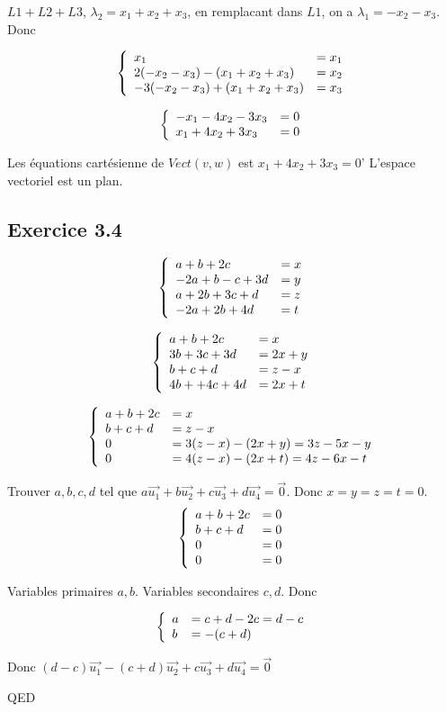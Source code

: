 \documentclass[]{book}
\theoremstyle{definition}
\begin{document}
$L1+L2+L3$, $\lambda_2 = x_1+x_2+x_3$, en remplacant dans $L1$, on a $\lambda_1 = -x_2 - x_3$. Donc

$$
\left\{ 
\begin{array}{l l}
x_1 & = x_1 \\
2(-x_2 - x_3) - (x_1 + x_2 + x_3) & = x_2 \\
-3(-x_2 - x_3) + (x_1 + x_2 + x_3) & = x_3 \\
\end{array}
\right. 
$$

$$
\left\{ 
\begin{array}{l l}
-x_1 - 4x_2 - 3x_3 & = 0 \\
x_1 + 4x_2 + 3x_3 & = 0 \\
\end{array}
\right. 
$$

Les \'equations cart\'esienne de $Vect(v,w)$ est $x_1 + 4x_2 + 3x_3 =0$' L'espace vectoriel est un plan.


\subsection*{Exercice 3.4}
$$
\left\{ 
\begin{array}{l l}
a + b + 2c & = x \\
-2a + b -c + 3d & = y \\
a + 2b + 3c + d & = z \\
-2a +2b + 4d & = t \\
\end{array}
\right. 
$$

$$
\left\{ 
\begin{array}{l l}
a + b + 2c & = x \\
 3b +3c + 3d & = 2x+y \\
 b + c + d & = z-x \\
4b + +4c + 4d & = 2x+t \\
\end{array}
\right. 
$$

$$
\left\{ 
\begin{array}{l l}
a + b + 2c & = x \\
 b + c + d & = z-x \\
 0 & = 3(z-x) - (2x+y) = 3z-5x-y \\
 0 & = 4(z-x) - (2x+t) = 4z -6x -t \\
\end{array}
\right. 
$$

Trouver $a,b,c,d$ tel que $a\vec{u_1} + b\vec{u_2} + c\vec{u_3} + d\vec{u_4} = \vec{0}$. Donc $x=y=z=t=0$.
$$
\left\{ 
\begin{array}{l l}
a + b + 2c & = 0 \\
 b + c + d & = 0 \\
 0 & = 0 \\
 0 & = 0 \\
\end{array}
\right. 
$$

Variables primaires $a, b$. Variables secondaires $c,d$. Donc

$$
\left\{ 
\begin{array}{l l}
 a & = c+d-2c = d - c \\
 b & = -(c+d) \\
\end{array}
\right. 
$$

Donc $(d-c)\vec{u_1} - (c+d)\vec{u_2} + c\vec{u_3} + d\vec{u_4} = \vec{0}$


QED
\end{document}

